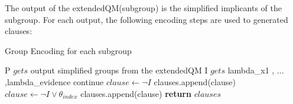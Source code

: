     The output of the extendedQM(subgroup) is the simplified implicants of the subgroup. For each output, the following encoding steps are used to generated clauses:
    
    \begin{algorithm}
    \caption{Group Encoding for each subgroup}\label{algorithm:group encoding}
    \begin{algorithmic}[1]
        \State P $gets$ output simplified groups from the extendedQM
        \State  I $gets$ lambda\_x1 , ... ,lambda\_evidence
                \State continue
            \EndIf
                \State $clause \gets \neg I$
                \State clauses.append(clause)
            \Else
                \State $clause \gets \neg I \vee \theta_{index}$
                \State clauses.append(clause)
            \EndIf
        \EndFor
    \EndFor
    \State \textbf{return} $clauses$
    \EndProcedure
    \end{algorithmic}
    \end{algorithm}

  

